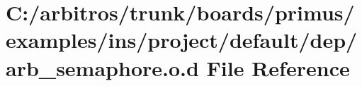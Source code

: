 \hypertarget{ins_2project_2default_2dep_2arb__semaphore_8o_8d}{\section{C\-:/arbitros/trunk/boards/primus/examples/ins/project/default/dep/arb\-\_\-semaphore.o.\-d File Reference}
\label{ins_2project_2default_2dep_2arb__semaphore_8o_8d}
}
